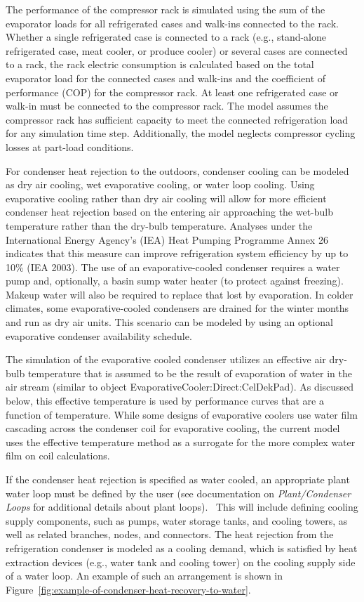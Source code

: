 The performance of the compressor rack is simulated using the sum of the evaporator loads for all refrigerated cases and walk-ins connected to the rack. Whether a single refrigerated case is connected to a rack (e.g., stand-alone refrigerated case, meat cooler, or produce cooler) or several cases are connected to a rack, the rack electric consumption is calculated based on the total evaporator load for the connected cases and walk-ins and the coefficient of performance (COP) for the compressor rack. At least one refrigerated case or walk-in must be connected to the compressor rack. The model assumes the compressor rack has sufficient capacity to meet the connected refrigeration load for any simulation time step. Additionally, the model neglects compressor cycling losses at part-load conditions.

For condenser heat rejection to the outdoors, condenser cooling can be modeled as dry air cooling, wet evaporative cooling, or water loop cooling. Using evaporative cooling rather than dry air cooling will allow for more efficient condenser heat rejection based on the entering air approaching the wet-bulb temperature rather than the dry-bulb temperature. Analyses under the International Energy Agency's (IEA) Heat Pumping Programme Annex 26 indicates that this measure can improve refrigeration system efficiency by up to 10\% (IEA 2003). The use of an evaporative-cooled condenser requires a water pump and, optionally, a basin sump water heater (to protect against freezing). Makeup water will also be required to replace that lost by evaporation. In colder climates, some evaporative-cooled condensers are drained for the winter months and run as dry air units. This scenario can be modeled by using an optional evaporative condenser availability schedule.

The simulation of the evaporative cooled condenser utilizes an effective air dry-bulb temperature that is assumed to be the result of evaporation of water in the air stream (similar to object EvaporativeCooler:Direct:CelDekPad). As discussed below, this effective temperature is used by performance curves that are a function of temperature. While some designs of evaporative coolers use water film cascading across the condenser coil for evaporative cooling, the current model uses the effective temperature method as a surrogate for the more complex water film on coil calculations.

If the condenser heat rejection is specified as water cooled, an appropriate plant water loop must be defined by the user (see documentation on \emph{Plant/Condenser Loops} for additional details about plant loops).~ This will include defining cooling supply components, such as pumps, water storage tanks, and cooling towers, as well as related branches, nodes, and connectors. The heat rejection from the refrigeration condenser is modeled as a cooling demand, which is satisfied by heat extraction devices (e.g., water tank and cooling tower) on the cooling supply side of a water loop. An example of such an arrangement is shown in Figure~\ref{fig:example-of-condenser-heat-recovery-to-water}.

